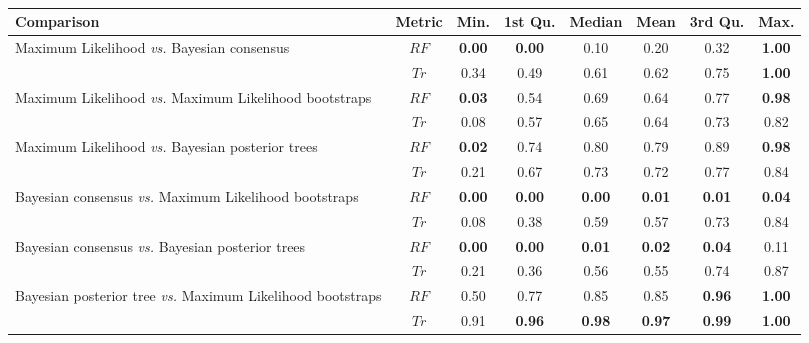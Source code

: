 \documentclass[12pt,letterpaper]{article}
\begin{document}
\begin{landscape}
\begin{table}[!ht]
\caption{}
\centering
\begin{tabular}{|l|c|c|c|c|c|c|c|}
  \hline
 Comparison &  Metric & Min. & 1st Qu. & Median & Mean & 3rd Qu. & Max. \\ 
  \hline
    Maximum Likelihood \textit{vs.} Bayesian consensus                 & $RF$ & \textbf{0.00} & \textbf{0.00} & 0.10 & 0.20 & 0.32 & \textbf{1.00} \\ 
                                                                       & $Tr$ & 0.34 & 0.49 & 0.61 & 0.62 & 0.75 & \textbf{1.00} \\ 
    Maximum Likelihood \textit{vs.} Maximum Likelihood bootstraps      & $RF$ & \textbf{0.03} & 0.54 & 0.69 & 0.64 & 0.77 & \textbf{0.98} \\ 
                                                                       & $Tr$ & 0.08 & 0.57 & 0.65 & 0.64 & 0.73 & 0.82 \\ 
    Maximum Likelihood \textit{vs.} Bayesian posterior trees           & $RF$ & \textbf{0.02} & 0.74 & 0.80 & 0.79 & 0.89 & \textbf{0.98} \\ 
                                                                       & $Tr$ & 0.21 & 0.67 & 0.73 & 0.72 & 0.77 & 0.84 \\ 
    Bayesian consensus \textit{vs.} Maximum Likelihood bootstraps      & $RF$ & \textbf{0.00} & \textbf{0.00} & \textbf{0.00} & \textbf{0.01} & \textbf{0.01} & \textbf{0.04} \\ 
                                                                       & $Tr$ & 0.08 & 0.38 & 0.59 & 0.57 & 0.73 & 0.84 \\ 
    Bayesian consensus \textit{vs.} Bayesian posterior trees           & $RF$ & \textbf{0.00} & \textbf{0.00} & \textbf{0.01} & \textbf{0.02} & \textbf{0.04} & 0.11 \\ 
                                                                       & $Tr$ & 0.21 & 0.36 & 0.56 & 0.55 & 0.74 & 0.87 \\ 
    Bayesian posterior tree \textit{vs.} Maximum Likelihood bootstraps & $RF$ & 0.50 & 0.77 & 0.85 & 0.85 & \textbf{0.96} & \textbf{1.00} \\ 
                                                                       & $Tr$ & 0.91 & \textbf{0.96} & \textbf{0.98} & \textbf{0.97} & \textbf{0.99} & \textbf{1.00} \\ 
   \hline
\end{tabular}
\label{Tab_Results-Difference_methods}
\end{table}
\end{landscape}
\end{document}
